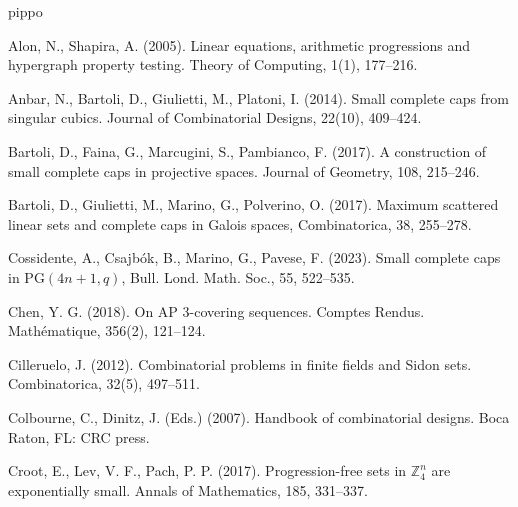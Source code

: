 \documentclass[11pt]{article}
\numberwithin{table}{section}
\theoremstyle{definition}
\begin{document}
	
	{\footnotesize
		\begin{thebibliography}{pippo}
			
			
			
			 Alon, N.,  Shapira, A. (2005). Linear equations, arithmetic progressions and hypergraph property testing. Theory of Computing, 1(1), 177--216.
			
			 Anbar, N., Bartoli, D., Giulietti, M., Platoni, I. (2014). Small complete caps from singular cubics. Journal of Combinatorial Designs, 22(10), 409--424.
			
			 Bartoli, D., Faina, G., Marcugini, S., Pambianco, F. (2017). A construction of small complete caps in projective spaces. Journal of Geometry, 108, 215--246.
			
			 Bartoli, D., Giulietti, M., Marino, G., Polverino, O. (2017). Maximum scattered linear sets and complete caps in Galois spaces, Combinatorica, 38, 255--278.
			
			
			
			 Cossidente, A., Csajb\'ok, B., Marino, G., Pavese, F. (2023). Small complete caps in $\mathrm{PG}(4n+1,q)$, Bull. Lond. Math. Soc., 55, 522--535.
			
			 Chen, Y. G. (2018). On AP 3-covering sequences. Comptes Rendus. Mathématique, 356(2), 121--124.
			
			
			  Cilleruelo, J. (2012). Combinatorial problems in finite fields and Sidon sets. Combinatorica, 32(5), 497--511.
			
			 Colbourne, C., Dinitz, J. (Eds.) (2007). Handbook of combinatorial designs. Boca Raton, FL: CRC press.
			
			 Croot, E., Lev, V. F.,  Pach, P. P. (2017). Progression-free sets in $\mathbb{Z}_4^n$ are exponentially small. Annals of Mathematics, 185, 331--337.
			

\end{thebibliography}}
\end{document}
